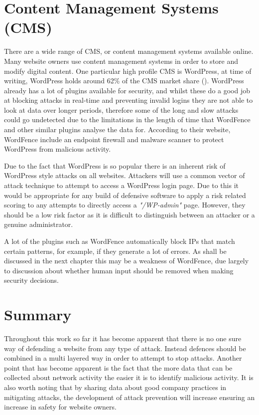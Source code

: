 \section{Content Management Systems (CMS)}

There are a wide range of CMS, or content management systems available online. Many website owners use content management systems in order to store and modify digital content. One particular high profile CMS is WordPress, at time of writing, WordPress holds around 62\% of the CMS market share (\cite{Wordpress}). WordPress already has a lot of plugins available for security, and whilst these do a good job at blocking attacks in real-time and preventing invalid logins they are not able to look at data over longer periods, therefore some of the long and slow attacks could go undetected due to the limitations in the length of time that WordFence and other similar plugins analyse the data for. According to their website, WordFence include an endpoint firewall and malware scanner to protect WordPress from malicious activity. 

Due to the fact that WordPress is so popular there is an inherent risk of WordPress style attacks on all websites. Attackers will use a common vector of attack technique to attempt to access a WordPress login page. Due to this it would be appropriate for any build of defensive software to apply a risk related scoring to any attempts to directly access a \textit{"/WP-admin"} page. However, they should be a low risk factor as it is difficult to distinguish between an attacker or a genuine administrator.

A lot of the plugins such as WordFence automatically block IPs that match certain patterns, for example, if they generate a lot of errors. As shall be discussed in the next chapter this may be a weakness of WordFence, due largely to discussion about whether human input should be removed when making security decisions.

\section{Summary}
Throughout this work so far it has become apparent that there is no one sure way of defending a website from any type of attack. Instead defences should be combined in a multi layered way in order to attempt to stop attacks. Another point that has  become apparent is the fact that the more data that can be collected about network activity the easier it is to identify malicious activity. It is also worth noting that by sharing data about good company practices in mitigating attacks, the development of attack prevention will increase ensuring an increase in safety for website owners.